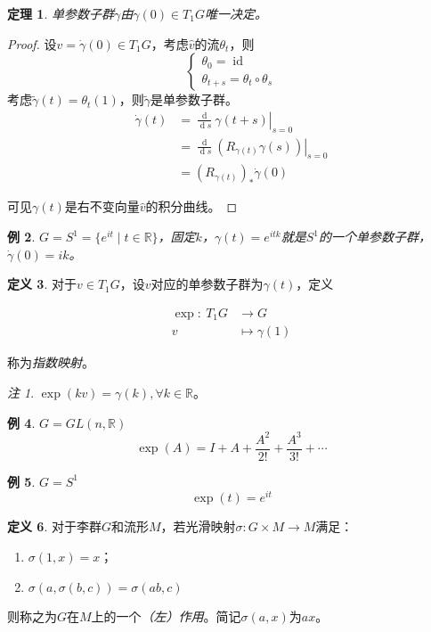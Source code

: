 \documentclass[winfonts,UTF8,c5size,a4paper,fancyhdr,hyperref,titlepage,nocap]{ctexart}
\newtheorem{thm}{定理}
\newtheorem{exa}[thm]{例}
\theoremstyle{definition}
\newtheorem{defn}[thm]{定义}
\theoremstyle{remark}
\newtheorem*{rem}{注}
\numberwithin{equation}{subsection}
\newcommand{\Real}{\mathbb{R}}
\newcommand{\red}{\color{red}}
\newcommand{\dd}{\operatorname{d}}
\newcommand{\local}[2]{\left.{#1}\right|_{#2}}%
\newcommand{\mapdes}[5]
  {
    \begin{align*}
      #1\colon\  #2 & \longrightarrow  #3 \\
            #4 & \mapsto  #5
    \end{align*}
  }
\newcommand{\id}{\operatorname{id}}
\begin{document}
\begin{thm}
  单参数子群$\gamma$由$\dot{\gamma}(0)\in T_1G$唯一决定。
\end{thm}
\begin{proof}
  设$v=\dot{\gamma}(0)\in T_1G$，考虑$\widehat{v}$的流$\theta_t$，则
\begin{equation*}
\begin{cases}
\theta_0=\id\\
\theta_{t+s}=\theta_t\circ\theta_s
\end{cases}
\end{equation*}
考虑$\widetilde{\gamma}(t)=\theta_t(1)$，则$\widetilde{\gamma}$是单参数子群。
\begin{align*}
\dot{\gamma}(t)&=\local{\frac{\dd}{\dd s}\gamma(t+s)}{s=0}\\
               &=\local{\frac{\dd}{\dd s}(R_{\gamma(t)}\gamma(s))}{s=0}\\
               &=(R_{\gamma(t)})_{\ast}\dot{\gamma}(0)
\end{align*}

可见$\gamma(t)$是右不变向量$\widehat{v}$的积分曲线。
\end{proof}

\begin{exa}
$G=S^1=\{e^{it}\mid t\in\Real\}$，固定$k$，$\gamma(t)=e^{itk}$就是$S^1$的一个单参数子群，$\dot{\gamma}(0)=ik$。
\end{exa}

\begin{defn}
  对于$v\in T_1G$，设$v$对应的单参数子群为$\gamma(t)$，定义
  \mapdes{\exp}{T_1G}{G}{v}{\gamma(1)}
称为\emph{\red 指数映射}。
\end{defn}
\begin{rem}
  $\exp(kv)=\gamma(k),\forall k\in\Real$。
\end{rem}

\begin{exa}
$G=GL(n,\Real)$
\begin{equation*}
\exp(A)=I+A+\frac{A^2}{2!}+\frac{A^3}{3!}+\cdots
\end{equation*}
\end{exa}
\begin{exa}
$G=S^1$
\begin{equation*}
\exp(t)=e^{it}
\end{equation*}
\end{exa}

\begin{defn}
  对于李群$G$和流形$M$，若光滑映射$\sigma\colon G\times M\to M$满足：
\begin{enumerate}[1)]
    \setlength{\itemindent}{2ex}
    \item $\sigma(1,x)=x$；
    \item $\sigma(a,\sigma(b,c))=\sigma(ab,c)$
\end{enumerate}
则称之为$G$在$M$上的一个\emph{\red （左）作用}。简记$\sigma(a,x)$为$ax$。
\end{defn}
\end{document}
